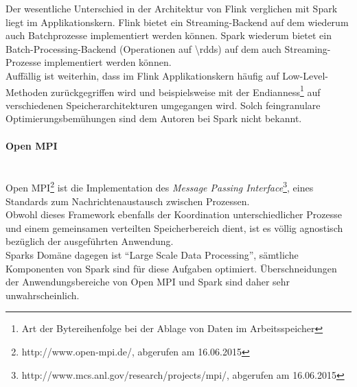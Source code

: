 Der wesentliche Unterschied in der Architektur von Flink verglichen mit Spark liegt im Applikationskern. Flink bietet ein Streaming-Backend auf dem wiederum auch Batchprozesse implementiert werden können. Spark wiederum bietet ein Batch-Processing-Backend (Operationen auf \glspl{\rdd}) auf dem auch Streaming-Prozesse implementiert werden können.\\

Auffällig ist weiterhin, dass im Flink Applikationskern häufig auf Low-Level-Methoden zurückgegriffen wird und beispielsweise mit der Endianness\footnote{Art der Bytereihenfolge bei der Ablage von Daten im Arbeitsspeicher} auf verschiedenen Speicherarchitekturen umgegangen wird. Solch feingranulare Optimierungsbemühungen sind dem Autoren bei Spark nicht bekannt.\\

\paragraph{Open MPI}\\

Open MPI\footnote{http://www.open-mpi.de/, abgerufen am 16.06.2015} ist die Implementation des \textit{Message Passing Interface}\footnote{http://www.mcs.anl.gov/research/projects/mpi/, abgerufen am 16.06.2015}, eines Standards zum Nachrichtenaustausch zwischen Prozessen.\\

Obwohl dieses Framework ebenfalls der Koordination unterschiedlicher Prozesse und einem gemeinsamen verteilten Speicherbereich dient, ist es völlig agnostisch bezüglich der ausgeführten Anwendung.\\
Sparks Domäne dagegen ist "`Large Scale Data Processing"', sämtliche Komponenten von Spark sind für diese Aufgaben optimiert. Überschneidungen der Anwendungsbereiche von Open MPI und Spark sind daher sehr unwahrscheinlich.\\